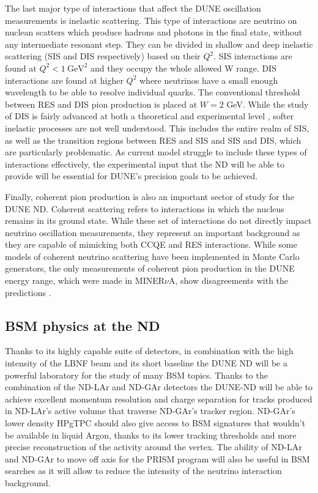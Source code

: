 The last major type of interactions that affect the DUNE oscillation measurements is inelastic scattering. This type of interactions are neutrino on nuclean scatters which produce hadrons and photons in the final state, without any intermediate resonant step. They can be divided in shallow and deep inelastic scattering (SIS and DIS respectively) based on their $Q^2$.  SIS interactions are found at $Q^2<1 \ \text{GeV}^2$ and they occupy the whole allowed W range. DIS interactions are found at higher $Q^2$ where neutrinos have a small enough wavelength to be able to resolve individual quarks. The conventional threshold between RES and DIS pion production is placed at $W=2$ GeV. While the study of DIS is fairly advanced at both a theoretical and experimental level \cite{NuTeV:2005wsg}, softer inelastic processes are not well understood. This includes the entire realm of SIS, as well as the transition regions between RES and SIS and SIS and DIS, which are particularly problematic. As current model struggle to include these types of interactions effectively, the experimental input that the ND will be able to provide will be essential for DUNE's precision goals to be achieved.

 Finally, coherent pion production is also an important sector of study for the DUNE ND. Coherent scattering refers to interactions in which the nucleus remains in its ground state. While these set of interactions do not directly impact neutrino oscillation measurements, they represent an important background as they are capable of mimicking both CCQE and RES interactions. While some models of coherent neutrino scattering have been implemented in Monte Carlo generators, the only measurements of coherent pion production in the DUNE energy range, which were made in MINER$\nu$A, show disagreements with the predictions \cite{MINERvA:2017ipy}. 
 
\subsection{BSM physics at the ND}
\label{Sec:ND-BSM}

Thanks to its highly capable suite of detectors, in combination with the high intensity of the LBNF beam and its short baseline the DUNE ND will be a powerful laboratory for the study of many BSM topics. Thanks to the combination of the ND-LAr and ND-GAr detectors the DUNE-ND will be able to achieve excellent momentum resolution and charge separation for tracks produced in ND-LAr's active volume that traverse ND-GAr's tracker region. ND-GAr's lower density HPgTPC should also give access to BSM signatures that wouldn't be available in liquid Argon, thanks to its lower tracking thresholds and more precise reconstruction of the activity around the vertex. The ability of ND-LAr and ND-GAr to move off axis for the PRISM program will also be useful in BSM searches as it will allow to reduce the intensity of the neutrino interaction background. 

